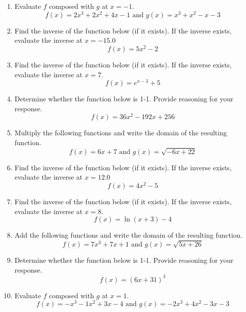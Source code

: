 \documentclass[14pt]{extbook}
\begin{document}
\begin{enumerate}
\item{
Evaluate $f$ composed with $g$ at $x=-1$.\[ f(x) = 2x^{3} +2 x^{2} +4 x -1 \text{ and } g(x) = x^{3} + x^{2} -x -3 \]} \newpage
\item{
Find the inverse of the function below (if it exists). If the inverse exists, evaluate the inverse at $x = -15.0$\[ f(x) = 5 x^2 - 2 \]} \newpage
\item{
Find the inverse of the function below (if it exists). If the inverse exists, evaluate the inverse at $x = 7$.\[ f(x) = e^{x-3}+5 \]} \newpage
\item{
Determine whether the function below is 1-1. Provide reasoning for your response.\[ f(x) = 36 x^2 - 192 x + 256 \]} \newpage
\item{
Multiply the following functions and write the domain of the resulting function.\[ f(x) = 6x + 7 \text{ and } g(x) = \sqrt{-6x+22}  \]} \newpage
\item{
Find the inverse of the function below (if it exists). If the inverse exists, evaluate the inverse at $x = 12.0$\[ f(x) = 4 x^2 - 5 \]} \newpage
\item{
Find the inverse of the function below (if it exists). If the inverse exists, evaluate the inverse at $x = 8$.\[ f(x) = \ln{(x+3)}-4 \]} \newpage
\item{
Add the following functions and write the domain of the resulting function.\[ f(x) = 7x^{3} +7 x + 1 \text{ and } g(x) = \sqrt{5x+26}  \]} \newpage
\item{
Determine whether the function below is 1-1. Provide reasoning for your response.\[ f(x) = (6 x + 31)^3 \]} \newpage
\item{
Evaluate $f$ composed with $g$ at $x=1$.\[ f(x) = -x^{3} -1 x^{2} +3 x -4 \text{ and } g(x) = -2x^{3} +4 x^{2} -3 x -3 \]} \newpage
\end{enumerate}
\end{document}
